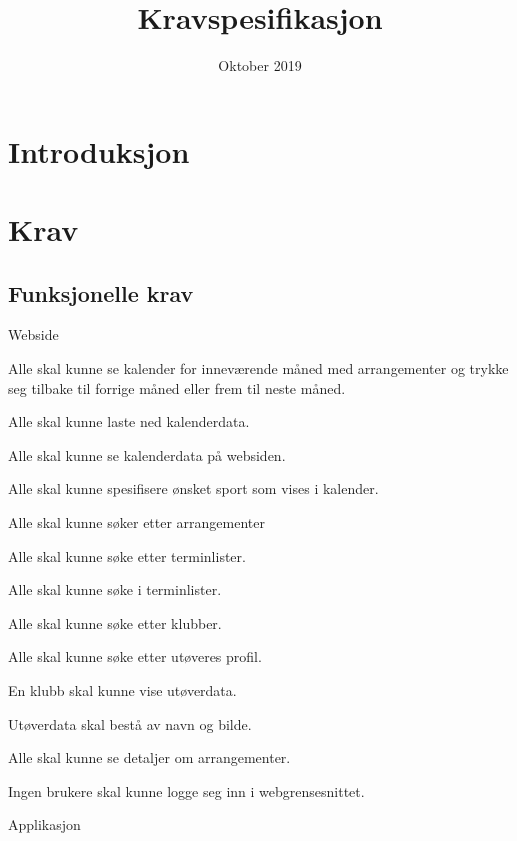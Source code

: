 \documentclass[norsk]{article}
\title{Kravspesifikasjon}
\author{}
\date{Oktober 2019}
\begin{document}
\maketitle

\section{Introduksjon}

\section{Krav}
\subsection{Funksjonelle krav}
\begin{legal}
    \item Webside
    \begin{legal}
        \item Alle skal kunne se kalender for inneværende måned med arrangementer og trykke seg tilbake til forrige måned eller frem til neste måned.
        \item Alle skal kunne laste ned kalenderdata. 
        \item Alle skal kunne se kalenderdata på websiden.
        \item Alle skal kunne spesifisere ønsket sport som vises i kalender.
        \item Alle skal kunne søker etter arrangementer
        \item Alle skal kunne søke etter terminlister.
        \item Alle skal kunne søke i terminlister.
        \item Alle skal kunne søke etter klubber.
        \item Alle skal kunne søke etter utøveres profil. 
        \item En klubb skal kunne vise utøverdata.
        \begin{legal}
            \item Utøverdata skal bestå av navn og bilde.
        \end {legal}
        \item Alle skal kunne se detaljer om arrangementer.
        \item Ingen brukere skal kunne logge seg inn 
        i webgrensesnittet.
    \end{legal}
    \item Applikasjon
    \begin{legal}

\end{legal}
\end{legal}
\end{document}
